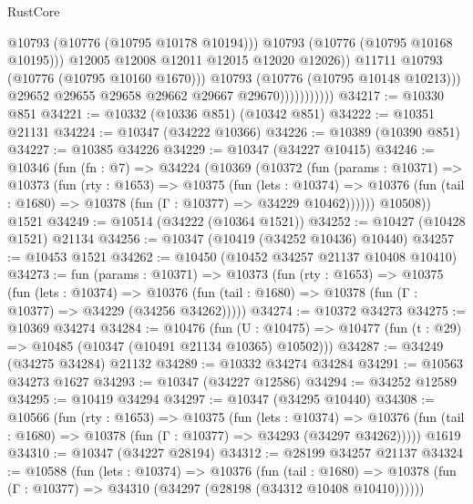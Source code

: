 \begin{lexlean}{RustCore}
\begin{coremodule}
                                      @10793
                                      (@10776 (@10795 @10178 @10194)))
                                    @10793
                                    (@10776 (@10795 @10168 @10195)))
                                  @12005
                                  @12008
                                  @12011
                                  @12015
                                  @12020
                                  @12026))
                              @11711
                              @10793
                              (@10776 (@10795 @10160 @1670)))
                            @10793
                            (@10776 (@10795 @10148 @10213)))
                          @29652
                          @29655
                          @29658
                          @29662
                          @29667
                          @29670)))))))))))
@34217 := @10330 @851
@34221 := @10332 (@10336 @851) (@10342 @851)
@34222 := @10351 @21131
@34224 := @10347 (@34222 @10366)
@34226 := @10389 (@10390 @851)
@34227 := @10385 @34226
@34229 := @10347 (@34227 @10415)
@34246 := @10346
    (fun (fn : @7) =>
    @34224
      (@10369
        (@10372
          (fun (params : @10371) =>
          @10373
            (fun (rty : @1653) =>
            @10375
              (fun (lets : @10374) =>
              @10376 (fun (tail : @1680) => @10378 (fun (Γ : @10377) => @34229 @10462))))))
        @10508))
    @1521
@34249 := @10514 (@34222 (@10364 @1521))
@34252 := @10427 (@10428 @1521) @21134
@34256 := @10347 (@10419 (@34252 @10436) @10440)
@34257 := @10453 @1521
@34262 := @10450 (@10452 @34257 @21137 @10408 @10410)
@34273 := fun (params : @10371) =>
  @10373
    (fun (rty : @1653) =>
    @10375
      (fun (lets : @10374) =>
      @10376 (fun (tail : @1680) => @10378 (fun (Γ : @10377) => @34229 (@34256 @34262)))))
@34274 := @10372 @34273
@34275 := @10369 @34274
@34284 := @10476
    (fun (U : @10475) => @10477 (fun (t : @29) => @10485 (@10347 (@10491 @21134 @10365) @10502)))
@34287 := @34249 (@34275 @34284) @21132
@34289 := @10332 @34274 @34284
@34291 := @10563 @34273 @1627
@34293 := @10347 (@34227 @12586)
@34294 := @34252 @12589
@34295 := @10419 @34294
@34297 := @10347 (@34295 @10440)
@34308 := @10566
    (fun (rty : @1653) =>
    @10375
      (fun (lets : @10374) =>
      @10376 (fun (tail : @1680) => @10378 (fun (Γ : @10377) => @34293 (@34297 @34262)))))
    @1619
@34310 := @10347 (@34227 @28194)
@34312 := @28199 @34257 @21137
@34324 := @10588
    (fun (lets : @10374) =>
    @10376
      (fun (tail : @1680) =>
      @10378 (fun (Γ : @10377) => @34310 (@34297 (@28198 (@34312 @10408 @10410))))))

\end{coremodule}
\end{lexlean}
